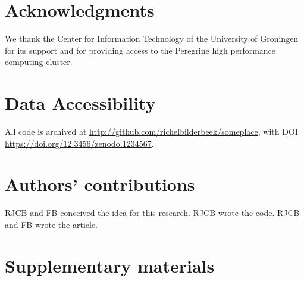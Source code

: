 \documentclass{article}
\newcommand{\richel}[1]{\textcolor{orange}{\textbf{[RB: #1]}}}
\begin{document}

\section{Acknowledgments}

We thank the Center for Information Technology of the University 
of Groningen for its support and for providing access to the Peregrine 
high performance computing cluster. 

\section{Data Accessibility}

All code is archived at \url{http://github.com/richelbilderbeek/someplace},
with DOI \url{https://doi.org/12.3456/zenodo.1234567}.

\section{Authors' contributions}

RJCB and FB conceived the idea for this research. 
RJCB wrote the code.
RJCB and FB wrote the article.





\appendix
\section{Supplementary materials}
\end{document}
